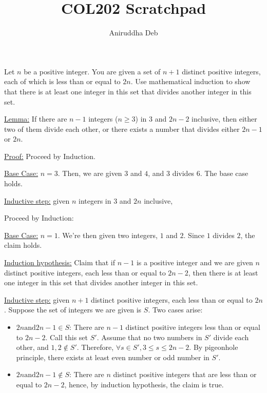 \documentclass[12pt,answers]{exam}
\title{\vspace{-2em}COL202 Scratchpad\vspace{-0.3em}}
\author{Aniruddha Deb\vspace{-1em}}
\date{\vspace{-1.5em}}
\begin{document}
\maketitle
\pagestyle{empty}
\begin{questions}

\question Let $n$ be a positive integer. You are given a set of $n+1$ distinct
positive integers, each of which is less than or equal to $2n$. Use mathematical
induction to show that there is at least one integer in this set that divides 
another integer in this set.
\begin{solution}
\underline{Lemma:} If there are $n-1$ integers ($n \ge 3$) in $3$ and $2n-2$ inclusive, then
either two of them divide each other, or there exists a number that divides 
either $2n-1$ or $2n$.

\underline{Proof:} Proceed by Induction. 

\underline{Base Case:} $n=3$. Then, we are given $3$ and $4$, and $3$ divides $6$.
The base case holds.

\underline{Inductive step:} given $n$ integers in $3$ and $2n$ inclusive, 

Proceed by Induction:

\underline{Base Case:} $n=1$. We're then given two integers, $1$ and $2$. Since
$1$ divides $2$, the claim holds.

\underline{Induction hypothesis:} Claim that if $n-1$ is a positive integer and 
we are given $n$ distinct positive integers, each less than or equal to $2n-2$,
then there is at least one integer in this set that divides another integer in 
this set.

\underline{Inductive step:} given $n+1$ distinct positive integers, each less
than or equal to $2n$. Suppose the set of integers we are given is $S$. Two cases arise:
\begin{itemize}
	\item $2n \text{and} 2n-1 \in S$: There are $n-1$ distinct positive integers
	less than or equal to $2n-2$. Call this set $S'$. Assume that no two numbers 
	in $S'$ divide each other, and $1,2 \not \in S'$. Therefore, $\forall s \in S', 
	3 \le s \le 2n-2$. By pigeonhole principle, there exists at least even number
	or odd number in $S'$. 
	\item $2n \text{and} 2n-1 \not \in S$: There are $n$ distinct positive integers that 
	are less than or equal to $2n-2$, hence, by induction hypothesis, the claim
	is true.
\end{itemize}
\end{solution}

\end{questions}
\end{document}
